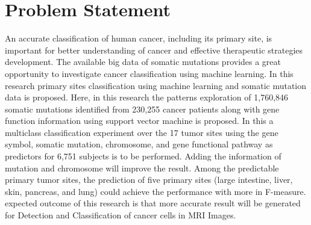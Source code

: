 \section{Problem Statement}
An accurate classification of human cancer, including its primary site, is important for better understanding of cancer and effective therapeutic strategies development. The available big data of somatic mutations provides a great opportunity to investigate cancer classification using machine learning. In this research primary sites classification using machine learning and somatic mutation data is proposed. Here, in this research the patterns exploration of 1,760,846 somatic mutations identified from 230,255 cancer patients along with gene function information using support vector machine is proposed. In this a multiclass classification experiment over the 17 tumor sites using the gene symbol, somatic mutation, chromosome, and gene functional pathway as predictors for 6,751 subjects is to be performed. Adding the information of mutation and chromosome will improve the result. Among the predictable primary tumor sites, the prediction of five primary sites (large intestine, liver, skin, pancreas, and lung) could achieve the performance with more in F-measure. expected outcome of this research is that more accurate result will be generated for Detection and Classification of cancer cells in MRI Images.

